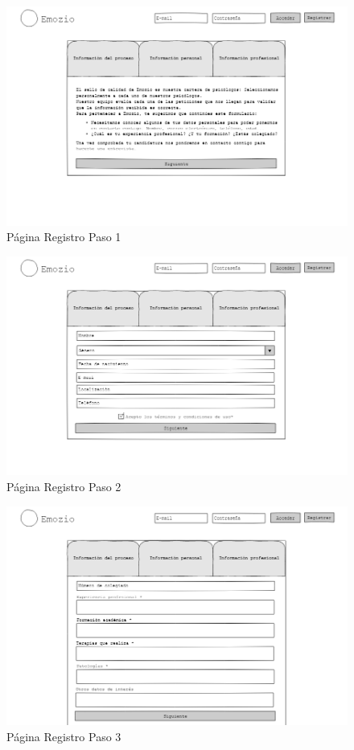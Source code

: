 \begin{figure}[htbp] 
    \centering
    \includegraphics[width=1\textwidth]{figuras/mockup_psicologos/registro1.png}
    \caption{Página Registro Paso 1}
\end{figure}	

\begin{figure}[htbp] 
    \centering
    \includegraphics[width=1\textwidth]{figuras/mockup_psicologos/registro2.png}
    \caption{Página Registro Paso 2}
\end{figure}	

\begin{figure}[htbp] 
    \centering
    \includegraphics[width=1\textwidth]{figuras/mockup_psicologos/registro3.png}
    \caption{Página Registro Paso 3}
\end{figure}	

